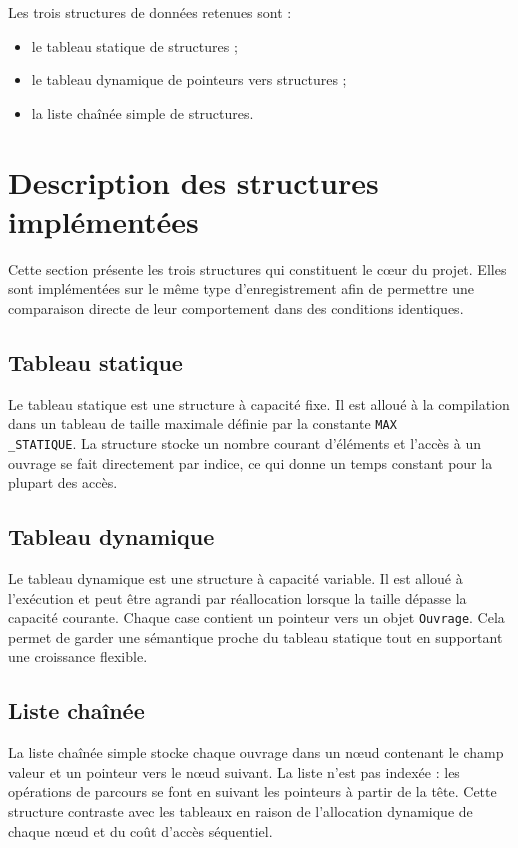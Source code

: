 \documentclass[12pt,a4paper]{article}
\begin{document}
Les trois structures de données retenues sont :
\begin{itemize}
  \item le tableau statique de structures ;
  \item le tableau dynamique de pointeurs vers structures ;
  \item la liste chaînée simple de structures.
\end{itemize}

\section{Description des structures implémentées}
Cette section présente les trois structures qui constituent le cœur du projet. Elles sont implémentées sur le même type d’enregistrement afin de permettre une comparaison directe de leur comportement dans des conditions identiques.

\subsection{Tableau statique}
Le tableau statique est une structure à capacité fixe. Il est alloué à la compilation dans un tableau de taille maximale définie par la constante \texttt{MAX\\_STATIQUE}. La structure stocke un nombre courant d’éléments et l’accès à un ouvrage se fait directement par indice, ce qui donne un temps constant pour la plupart des accès.

\subsection{Tableau dynamique}
Le tableau dynamique est une structure à capacité variable. Il est alloué à l’exécution et peut être agrandi par réallocation lorsque la taille dépasse la capacité courante. Chaque case contient un pointeur vers un objet \texttt{Ouvrage}. Cela permet de garder une sémantique proche du tableau statique tout en supportant une croissance flexible.

\subsection{Liste chaînée}
La liste chaînée simple stocke chaque ouvrage dans un nœud contenant le champ valeur et un pointeur vers le nœud suivant. La liste n’est pas indexée : les opérations de parcours se font en suivant les pointeurs à partir de la tête. Cette structure contraste avec les tableaux en raison de l’allocation dynamique de chaque nœud et du coût d’accès séquentiel.
\end{document}
